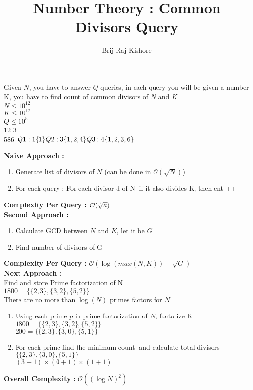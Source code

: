\documentclass[12pt]{article}
\title{Number Theory : Common Divisors Query}
\date{}
\author{Brij Raj Kishore}
\begin{document}
	\maketitle
	Given $N$, you have to answer $Q$ queries, in each query you will be given a number K, you have to find count of common divisors of $N$ and $K$ \\
	$N \leq 10^{12}$ \\
	$K \leq 10^{12}$ \\
	$Q \leq 10^5$ \\
	$12$ $3$ \\
	$5 \\ 8 \\ 6 \\$
	$Q1 : 1 \{1\} \\ Q2 : 3 \{1, 2, 4\} \\ Q3 : 4 \{1, 2, 3, 6\}\\$


	\textbf{Naive Approach :} \\
	\begin{enumerate}
		\item Generate list of divisors of $N$ (can be done in $\mathcal{O}(\sqrt{N})$) 
		\item For each query : For each divisor d of N, if it also divides K, then cnt ++
	\end{enumerate}

	\textbf{Complexity Per Query : } $\mathcal{O}(\sqrt[\leftroot{-3}\uproot{3}3]{a})$ \\


	\textbf{Second Approach : } \\
	\begin{enumerate}
		\item Calculate GCD between $N$ and $K$, let it be $G$
		\item Find number of divisors of G
	\end{enumerate}
	
	\textbf{Complexity Per Query : } $\mathcal{O}(\log(max(N, K)) + \sqrt{G})$ \\


	\textbf{Next Approach : } \\

	Find and store Prime factorization of N \\
	$1800 = \{\{2, 3\}, \{3, 2\}, \{5, 2\}\}$ \\
	There are no more than $\log(N)$ primes factors for $N$ \\
	\begin{enumerate}
		\item Using each prime $p$ in prime factorization of $N$, factorize K \\
		$1800 = \{\{2, 3\}, \{3, 2\}, \{5, 2\}\}$ \\
		$200 = \{\{2, 3\}, \{3, 0\}, \{5, 1\}\}$
		
		\item For each prime find the minimum count, and calculate total divisors \\
		$\{\{2, 3\}, \{3, 0\}, \{5, 1\}\}$ \\
		$(3 + 1) \times (0 + 1) \times (1 + 1)$ \\

	\end{enumerate}

	\textbf{Overall Complexity : }
	$\mathcal{O}((\log{N})^2)$
\end{document}
